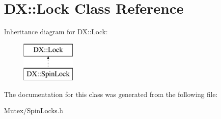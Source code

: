 \hypertarget{class_d_x_1_1_lock}{\section{D\-X\-:\-:Lock Class Reference}
\label{class_d_x_1_1_lock}
}
Inheritance diagram for D\-X\-:\-:Lock\-:\begin{figure}[H]
\begin{center}
\leavevmode
\includegraphics[height=2.000000cm]{class_d_x_1_1_lock}
\end{center}
\end{figure}


The documentation for this class was generated from the following file\-:\begin{DoxyCompactItemize}
\item 
Mutex/Spin\-Locks.\-h\end{DoxyCompactItemize}
